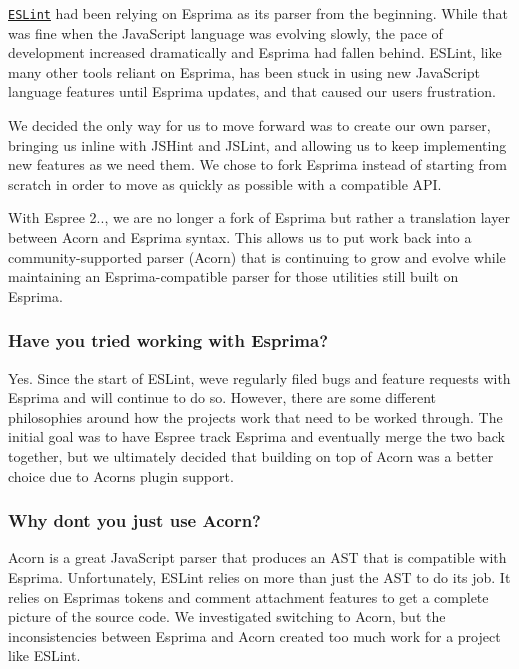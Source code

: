 \href{http://eslint.org}{\tt E\+S\+Lint} had been relying on Esprima as its parser from the beginning. While that was fine when the Java\+Script language was evolving slowly, the pace of development increased dramatically and Esprima had fallen behind. E\+S\+Lint, like many other tools reliant on Esprima, has been stuck in using new Java\+Script language features until Esprima updates, and that caused our users frustration.

We decided the only way for us to move forward was to create our own parser, bringing us inline with J\+S\+Hint and J\+S\+Lint, and allowing us to keep implementing new features as we need them. We chose to fork Esprima instead of starting from scratch in order to move as quickly as possible with a compatible A\+PI.

With Espree 2.., we are no longer a fork of Esprima but rather a translation layer between Acorn and Esprima syntax. This allows us to put work back into a community-\/supported parser (Acorn) that is continuing to grow and evolve while maintaining an Esprima-\/compatible parser for those utilities still built on Esprima.

\subsubsection*{Have you tried working with Esprima?}

Yes. Since the start of E\+S\+Lint, we\textquotesingle{}ve regularly filed bugs and feature requests with Esprima and will continue to do so. However, there are some different philosophies around how the projects work that need to be worked through. The initial goal was to have Espree track Esprima and eventually merge the two back together, but we ultimately decided that building on top of Acorn was a better choice due to Acorn\textquotesingle{}s plugin support.

\subsubsection*{Why don\textquotesingle{}t you just use Acorn?}

Acorn is a great Java\+Script parser that produces an A\+ST that is compatible with Esprima. Unfortunately, E\+S\+Lint relies on more than just the A\+ST to do its job. It relies on Esprima\textquotesingle{}s tokens and comment attachment features to get a complete picture of the source code. We investigated switching to Acorn, but the inconsistencies between Esprima and Acorn created too much work for a project like E\+S\+Lint.

